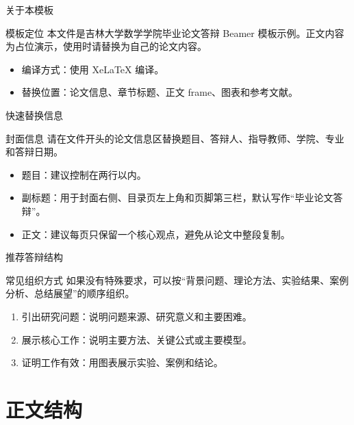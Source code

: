 \documentclass[12pt,aspectratio=43]{beamer}
\newcommand{\JLUEmph}[1]{{\JLUHei #1}}
\newcommand{\JLUSectionTitleTwo}{正文结构}
\begin{document}
\begin{frame}{关于本模板}
  \begin{block}{模板定位}
    本文件是吉林大学数学学院毕业论文答辩 Beamer 模板示例。正文内容为占位演示，使用时请替换为自己的论文内容。
  \end{block}

  \begin{itemize}
    \item 编译方式：使用 XeLaTeX 编译。
    \item 替换位置：论文信息、章节标题、正文 frame、图表和参考文献。
  \end{itemize}
\end{frame}

\begin{frame}{快速替换信息}
  \begin{block}{封面信息}
    请在文件开头的论文信息区替换题目、答辩人、指导教师、学院、专业和答辩日期。
  \end{block}

  \begin{itemize}
    \item \JLUEmph{题目}：建议控制在两行以内。
    \item \JLUEmph{副标题}：用于封面右侧、目录页左上角和页脚第三栏，默认写作“毕业论文答辩”。
    \item \JLUEmph{正文}：建议每页只保留一个核心观点，避免从论文中整段复制。
  \end{itemize}
\end{frame}

\begin{frame}{推荐答辩结构}
  \begin{block}{常见组织方式}
    如果没有特殊要求，可以按“背景问题、理论方法、实验结果、案例分析、总结展望”的顺序组织。
  \end{block}

  \begin{enumerate}
    \item 引出研究问题：说明问题来源、研究意义和主要困难。
    \item 展示核心工作：说明主要方法、关键公式或主要模型。
    \item 证明工作有效：用图表展示实验、案例和结论。
  \end{enumerate}
\end{frame}

\section{\JLUSectionTitleTwo}
\end{document}

